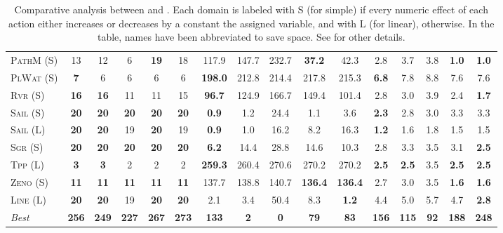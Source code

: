 \documentclass[11pt,landscape]{article}
\begin{document}
\begin{table*}[tb]
{\begin{tabular}{|l||ccccc||ccccc||ccccc||}
\textsc{PathM} (S)&13&12&6&\textbf{19}&18&117.9&147.7&232.7&\textbf{37.2}&42.3&2.8&3.7&3.8&\textbf{1.0}&\textbf{1.0}\\
\textsc{PlWat} (S)&\textbf{7}&6&6&6&6&\textbf{198.0}&212.8&214.4&217.8&215.3&\textbf{6.8}&7.8&8.8&7.6&7.6\\
\textsc{Rvr} (S)&\textbf{16}&\textbf{16}&11&11&15&\textbf{96.7}&124.9&166.7&149.4&101.4&2.8&3.0&3.9&2.4&\textbf{1.7}\\
\textsc{Sail} (S)&\textbf{20}&\textbf{20}&\textbf{20}&\textbf{20}&\textbf{20}&\textbf{0.9}&1.2&24.4&1.1&3.6&\textbf{2.3}&2.8&3.0&3.3&3.3\\
\textsc{Sail} (L)&\textbf{20}&\textbf{20}&19&\textbf{20}&19&\textbf{0.9}&1.0&16.2&8.2&16.3&\textbf{1.2}&1.6&1.8&1.5&1.5\\
\textsc{Sgr} (S)&\textbf{20}&\textbf{20}&\textbf{20}&\textbf{20}&\textbf{20}&\textbf{6.2}&14.4&28.8&14.6&10.3&2.8&3.3&3.5&3.1&\textbf{2.5}\\
\textsc{Tpp} (L)&\textbf{3}&\textbf{3}&2&2&2&\textbf{259.3}&260.4&270.6&270.2&270.2&\textbf{2.5}&\textbf{2.5}&3.5&\textbf{2.5}&\textbf{2.5}\\
\textsc{Zeno} (S)&\textbf{11}&\textbf{11}&\textbf{11}&\textbf{11}&\textbf{11}&137.7&138.8&140.7&\textbf{136.4}&\textbf{136.4}&2.7&3.0&3.5&\textbf{1.6}&\textbf{1.6}\\
\textsc{Line} (L)&\textbf{20}&\textbf{20}&19&\textbf{20}&\textbf{20}&2.1&3.4&50.4&8.3&\textbf{1.2}&4.4&5.0&5.7&4.7&\textbf{2.8}
\\\hline
\textit{Best}&\textbf{256}&\textbf{249}&\textbf{227}&\textbf{267}&\textbf{273}&\textbf{133}&\textbf{2}&\textbf{0}&\textbf{79}&\textbf{83}&\textbf{156}&\textbf{115}&\textbf{92}&\textbf{188}&\textbf{248}\\\hline

        \end{tabular}}
        \caption{Comparative analysis between  \pattya and \pattye. Each domain is labeled with S (for simple) if every numeric effect of each action either increases or decreases by a constant the assigned variable, and with L (for linear), otherwise. In the table, names have been abbreviated to save space.  See \cite{ipc2023} for other details.}
        \label{tab:exp-patty-a-patty-e}
        \end{table*}
        
\end{document}

